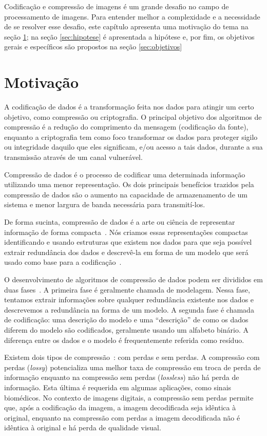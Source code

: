 Codificação e compressão de imagens é um grande desafio no campo de processamento de imagens. Para entender melhor a complexidade e a necessidade de se resolver esse desafio, este capítulo apresenta uma motivação do tema na seção \ref{sec:motivacao}; na seção \ref{sec:hipotese} é apresentada a hipótese e, por fim, os objetivos gerais e específicos são propostos na seção \ref{sec:objetivos}

\section{Motivação}
\label{sec:motivacao}
A codificação de dados é a transformação feita nos dados para atingir um certo objetivo, como compressão ou criptografia. O principal objetivo dos algoritmos de compressão é a redução do comprimento da mensagem (codificação da fonte), enquanto a criptografia tem como foco transformar os dados para proteger sigilo ou integridade daquilo que eles significam, e/ou acesso a tais dados, durante a sua transmissão através de um canal vulnerável.

Compressão de dados é o processo de codificar uma determinada informação utilizando uma menor representação. Os dois principais benefícios trazidos pela compressão de dados são o aumento na capacidade de armazenamento de um sistema e menor largura de banda necessária para transmití-los.  

De forma sucinta, compressão de dados é a arte ou ciência de representar informação de forma compacta~\cite{sayood2017introduction}. Nós criamos essas representações compactas identificando e usando estruturas que existem nos dados para que seja possível extrair redundância dos dados e descrevê-la em forma de um modelo que será usado como base para a codificação~\cite{sayood2017introduction}. 

O desenvolvimento de algoritmos de compressão de dados podem ser divididos em duas fases~\cite{sayood2017introduction}. A primeira fase é geralmente chamada de modelagem. Nessa fase, tentamos extrair informações sobre qualquer redundância existente nos dados e descrevemos a redundância na forma de um modelo. A segunda fase é chamada de codificação: uma descrição do modelo e uma ``descrição'' de como os dados diferem do modelo são codificados, geralmente usando um alfabeto binário. A diferença entre os dados e o modelo é frequentemente referida como resíduo.

Existem dois tipos de compressão~\cite{sayood2017introduction}: com perdas e sem perdas. A compressão com perdas (\textit{lossy}) potencializa uma melhor taxa de compressão em troca de perda de informação enquanto na compressão sem perdas (\textit{lossless}) não há perda de informação. Esta última é requerida em algumas aplicações, como sinais biomédicos. No contexto de imagens digitais, a compressão sem perdas permite que, após a codificação da imagem, a imagem decodificada seja idêntica à original, enquanto na compressão com perdas a imagem decodificada não é idêntica à original e há perda de qualidade visual.

